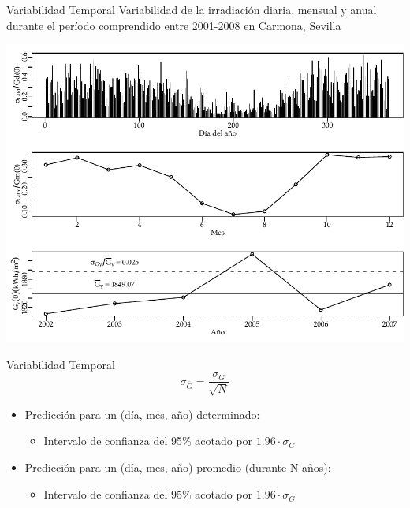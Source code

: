 \documentclass[xcolor={usenames,svgnames,dvipsnames}]{beamer}
\begin{document}
\begin{frame}[label={sec:org7629025}]{Variabilidad Temporal}
Variabilidad de la irradiación diaria, mensual y anual durante el período comprendido entre 2001-2008 en Carmona, Sevilla
\begin{center}
\includegraphics[width=.9\linewidth]{../figs/VariabilidadRadiacionDiario.pdf}
\end{center}

\nocite{Perpinan2009}
\end{frame}

\begin{frame}[label={sec:org37a4432}]{Variabilidad Temporal}
\[
\sigma_{\overline{G}}=\frac{\sigma_{G}}{\sqrt{N}}
\]

\begin{itemize}
\item Predicción para un (día, mes, año) \alert{determinado}: 

\begin{itemize}
\item Intervalo de confianza del 95\% acotado por \(1.96\cdot\sigma_{G}\)
\end{itemize}

\item Predicción para un (día, mes, año) \alert{promedio (durante N años)}: 

\begin{itemize}
\item Intervalo de confianza del 95\% acotado por \(1.96\cdot\sigma_{\overline{G}}\)
\end{itemize}
\end{itemize}
\end{frame}
\end{document}
